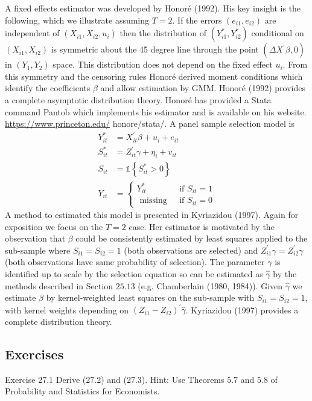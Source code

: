 \documentclass[10pt]{article}
\begin{document}
A fixed effects estimator was developed by Honoré (1992). His key insight is the following, which we illustrate assuming $T=2$. If the errors $\left(e_{i 1}, e_{i 2}\right)$ are independent of $\left(X_{i 1}, X_{i 2}, u_{i}\right)$ then the distribution of $\left(Y_{i 1}^{*}, Y_{i 2}^{*}\right)$ conditional on $\left(X_{i 1}, X_{i 2}\right)$ is symmetric about the 45 degree line through the point $\left(\Delta X^{\prime} \beta, 0\right)$ in $\left(Y_{1}, Y_{2}\right)$ space. This distribution does not depend on the fixed effect $u_{i}$. From this symmetry and the censoring rules Honoré derived moment conditions which identify the coefficients $\beta$ and allow estimation by GMM. Honoré (1992) provides a complete asymptotic distribution theory. Honoré has provided a Stata command Pantob which implements his estimator and is available on his website. \href{https://www.princeton.edu/}{https://www.princeton.edu/} honore/stata/. A panel sample selection model is
$$
\begin{aligned}
Y_{i t}^{*} &=X_{i t}^{\prime} \beta+u_{i}+e_{i t} \\
S_{i t}^{*} &=Z_{i t}^{\prime} \gamma+\eta_{i}+v_{i t} \\
S_{i t} &=\mathbb{1}\left\{S_{i t}^{*}>0\right\} \\
Y_{i t} &=\left\{\begin{array}{cc}
Y_{i t}^{*} & \text { if } S_{i t}=1 \\
\text { missing } & \text { if } S_{i t}=0
\end{array}\right.
\end{aligned}
$$
A method to estimated this model is presented in Kyriazidou (1997). Again for exposition we focus on the $T=2$ case. Her estimator is motivated by the observation that $\beta$ could be consistently estimated by least squares applied to the sub-sample where $S_{i 1}=S_{i 2}=1$ (both observations are selected) and $Z_{i 1}^{\prime} \gamma=Z_{i 2}^{\prime} \gamma$ (both observations have same probability of selection). The parameter $\gamma$ is identified up to scale by the selection equation so can be estimated as $\widehat{\gamma}$ by the methods described in Section $25.13$ (e.g. Chamberlain (1980, 1984)). Given $\hat{\gamma}$ we estimate $\beta$ by kernel-weighted least squares on the sub-sample with $S_{i 1}=S_{i 2}=1$, with kernel weights depending on $\left(Z_{i 1}-Z_{i 2}\right)^{\prime} \widehat{\gamma}$. Kyriazidou (1997) provides a complete distribution theory.

\subsection{Exercises}
Exercise 27.1 Derive (27.2) and (27.3). Hint: Use Theorems $5.7$ and $5.8$ of Probability and Statistics for Economists.
\end{document}
